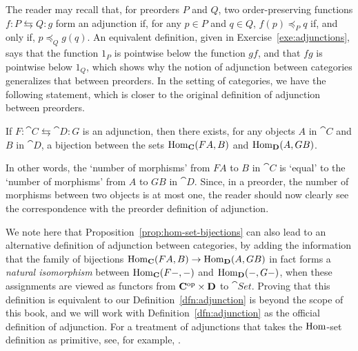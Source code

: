 The reader may recall that, for preorders $P$ and $Q$, two order-preserving functions $f \colon P \leftrightarrows Q \colon g$ form an adjunction if, for any $p \in P$ and $q \in Q$, $f(p) \preceq_P q$ if, and only if, $p \preceq_Q g(q)$. An equivalent definition, given in Exercise~\ref{exe:adjunctions}, says that the function $1_P$ is pointwise below the function $gf$, and that $fg$ is pointwise below $1_Q$, which shows why the notion of adjunction between categories generalizes that between preorders. In the setting of categories, we have the following statement, which is closer to the original definition of adjunction between preorders.
\begin{proposition}\label{prop:hom-set-bijections}
If $F \colon \cat{C} \leftrightarrows \cat{D} \colon G$ is an adjunction, then there exists, for any objects $A$ in $\cat{C}$ and $B$ in $\cat{D}$, a bijection between the sets $\mathrm{Hom}_{\mathbf{C}}(FA, B)$ and $\mathrm{Hom}_{\mathbf{D}}(A, GB)$.
\end{proposition}
In other words, the `number of morphisms' from $FA$ to $B$ in $\cat{C}$ is `equal' to the `number of morphisms' from $A$ to $GB$ in $\cat{D}$. Since, in a preorder, the number of morphisms between two objects is at most one, the reader should now clearly see the correspondence with the preorder definition of adjunction.

We note here that Proposition~\ref{prop:hom-set-bijections} can also lead to an alternative definition of adjunction between categories, by adding the information that the family of bijections $\mathrm{Hom}_{\mathbf{C}} (FA, B) \to \mathrm{Hom}_{\mathbf{D}}(A, GB)$ in fact forms a \emph{natural isomorphism} between  $\mathrm{Hom}_{\mathbf{C}}(F-, -)$ and $\mathrm{Hom}_{\mathbf{D}}(-, G-)$, when these assignments are viewed as functors from $\mathbf{C}^{\mathrm{op}} \times \mathbf{D}$ to $\cat{Set}$. Proving that this definition is equivalent to our Definition~\ref{dfn:adjunction} is beyond the scope of this book, and we will work with Definition~\ref{dfn:adjunction} as the official definition of adjunction. For a treatment of adjunctions that takes the $\mathrm{Hom}$-set definition as primitive, see, for example, \cite[Ch.~4]{Mac1971}.

